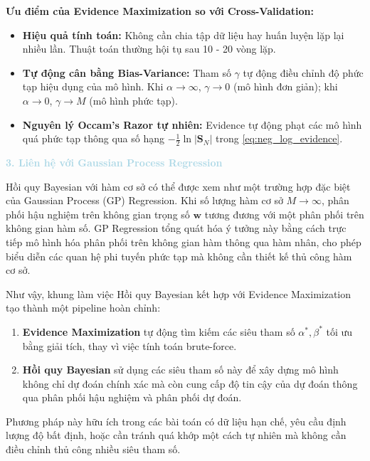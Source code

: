 \textbf{Ưu điểm của Evidence Maximization so với Cross-Validation:}
\begin{itemize} [labelsep=10pt, leftmargin=2cm]
    \item \textbf{Hiệu quả tính toán:} Không cần chia tập dữ liệu hay huấn luyện lặp lại nhiều lần. Thuật toán thường hội tụ sau 10 - 20 vòng lặp.
    \item \textbf{Tự động cân bằng Bias-Variance:} Tham số $\gamma$ tự động điều chỉnh độ phức tạp hiệu dụng của mô hình. Khi $\alpha \to \infty$, $\gamma \to 0$ (mô hình đơn giản); khi $\alpha \to 0$, $\gamma \to M$ (mô hình phức tạp).
    \item \textbf{Nguyên lý Occam's Razor tự nhiên:} Evidence tự động phạt các mô hình quá phức tạp thông qua số hạng $-\frac{1}{2}\ln|\mathbf{S}_N|$ trong \eqref{eq:neg_log_evidence}.
\end{itemize}

\vspace{0.5em}
\textcolor{lightblue}{\textbf{3. Liên hệ với Gaussian Process Regression}}
\vspace{0.5em}

Hồi quy Bayesian với hàm cơ sở có thể được xem như một trường hợp đặc biệt của Gaussian Process (GP) Regression. Khi số lượng hàm cơ sở $M \to \infty$, phân phối hậu nghiệm trên không gian trọng số $\mathbf{w}$ tương đương với một phân phối trên không gian hàm số. GP Regression tổng quát hóa ý tưởng này bằng cách trực tiếp mô hình hóa phân phối trên không gian hàm thông qua hàm nhân, cho phép biểu diễn các quan hệ phi tuyến phức tạp mà không cần thiết kế thủ công hàm cơ sở.

Như vậy, khung làm việc Hồi quy Bayesian kết hợp với Evidence Maximization tạo thành một pipeline hoàn chỉnh:
\begin{enumerate}
    \item \textbf{Evidence Maximization} tự động tìm kiếm các siêu tham số $\alpha^*, \beta^*$ tối ưu bằng giải tích, thay vì việc tính toán brute-force.
    \item \textbf{Hồi quy Bayesian} sử dụng các siêu tham số này để xây dựng mô hình không chỉ dự đoán chính xác mà còn cung cấp độ tin cậy của dự đoán thông qua phân phối hậu nghiệm và phân phối dự đoán.
\end{enumerate}

Phương pháp này hữu ích trong các bài toán có dữ liệu hạn chế, yêu cầu định lượng độ bất định, hoặc cần tránh quá khớp một cách tự nhiên mà không cần điều chỉnh thủ công nhiều siêu tham số.

